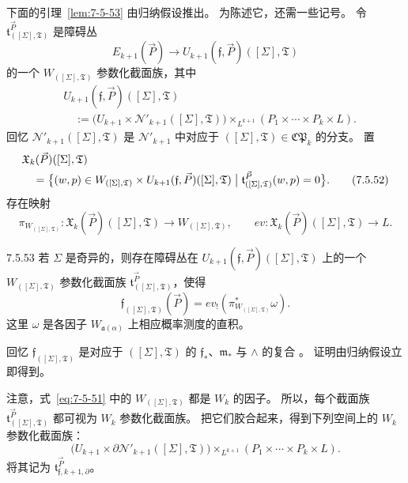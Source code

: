 下面的引理~\ref{lem:7-5-53} 由归纳假设推出。
为陈述它，还需一些记号。
令
$\mathfrak t_{([\Sigma],\mathfrak T)}^{\vec P}$
是障碍丛
\[
E_{k+1}(\vec P)
\longrightarrow
U_{k+1}(\mathfrak f,\vec P)([\Sigma],\mathfrak T)
\]
的一个 $W_{([\Sigma],\mathfrak T)}$ 参数化截面族，其中
\[
\begin{aligned}
&U_{k+1}(\mathfrak f,\vec P)([\Sigma],\mathfrak T)\\
&\quad:=
\bigl(U_{k+1}\times
\mathcal N'_{k+1}([\Sigma],\mathfrak T)\bigr)
\mathbin{\times_{L^{k+1}}}
(P_1\times\cdots\times P_k\times L).
\end{aligned}
\]
回忆
$\mathcal N'_{k+1}([\Sigma],\mathfrak T)$
是 $\mathcal N'_{k+1}$ 中对应于
$([\Sigma],\mathfrak T)\in\mathfrak{CP}_k$ 的分支。
置
\begin{align}
&\mathfrak X_k(\vec P)([\Sigma],\mathfrak T)
\notag\\
&\quad={}
\bigl\{(w,p)\in
W_{([\Sigma],\mathfrak T)}\times
U_{k+1}(\mathfrak f,\vec P)([\Sigma],\mathfrak T)
\bigm|
\mathfrak t_{([\Sigma],\mathfrak T)}^{\vec P}
(w,p)=0\bigr\}.
\tag{7.5.52}\label{eq:7-5-52}
\end{align}
存在映射
\[
\pi_{W_{([\Sigma],\mathfrak T)}}\colon
\mathfrak X_k(\vec P)([\Sigma],\mathfrak T)
\longrightarrow W_{([\Sigma],\mathfrak T)},
\qquad
ev\colon
\mathfrak X_k(\vec P)([\Sigma],\mathfrak T)
\longrightarrow L.
\]

\begin{lemma}{7.5.53}\label{lem:7-5-53}
若 $\Sigma$ 是奇异的，则存在障碍丛在
$U_{k+1}(\mathfrak f,\vec P)([\Sigma],\mathfrak T)$
上的一个
$W_{([\Sigma],\mathfrak T)}$ 参数化截面族
$\mathfrak t_{([\Sigma],\mathfrak T)}^{\vec P}$，使得
\[
\mathfrak f_{([\Sigma],\mathfrak T)}(\vec P)
=ev_!\left(
\pi_{W_{([\Sigma],\mathfrak T)}}^*\omega
\right).
\]
这里 $\omega$ 是各因子
$W_{\mathfrak a(\alpha)}$ 上相应概率测度的直积。
\end{lemma}

回忆 $\mathfrak f_{([\Sigma],\mathfrak T)}$
是对应于 $([\Sigma],\mathfrak T)$ 的
$\mathfrak f_*$、$\mathfrak m_*$ 与 $\wedge$ 的复合
。
证明由归纳假设立即得到。

注意，式~\eqref{eq:7-5-51} 中的
$W_{([\Sigma],\mathfrak T)}$ 都是 $W_k$ 的因子。
所以，每个截面族
$\mathfrak t_{([\Sigma],\mathfrak T)}^{\vec P}$
都可视为 $W_k$ 参数化截面族。
把它们胶合起来，得到下列空间上的
$W_k$ 参数化截面族：
\[
\bigl(U_{k+1}\times
\partial\mathcal N'_{k+1}([\Sigma],\mathfrak T)\bigr)
\mathbin{\times_{L^{k+1}}}
(P_1\times\cdots\times P_k\times L).
\]
将其记为
$\mathfrak t_{\mathfrak f,k+1,\partial}^{\vec P}$。

